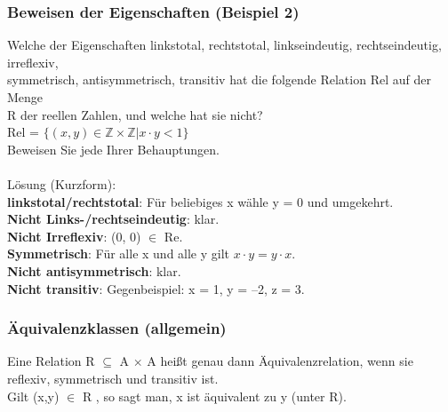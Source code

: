 \documentclass[6pt,a4paper]{scrartcl}
\begin{document}
\begin{multicols*}{2}
\subsubsection{Beweisen der Eigenschaften (Beispiel 2)}
Welche der Eigenschaften linkstotal, rechtstotal, linkseindeutig, rechtseindeutig, irreflexiv,\\
symmetrisch, antisymmetrisch, transitiv hat die folgende Relation Rel auf der Menge\\
R der reellen Zahlen, und welche hat sie nicht?\\
Rel = $\{ (x, y) \in \mathbb{Z} \times \mathbb{Z} | x \cdot y < 1 \}$\\
Beweisen Sie jede Ihrer Behauptungen.\\
\\
Lösung (Kurzform):\\
\textbf{linkstotal/rechtstotal}: Für beliebiges x wähle y = 0 und umgekehrt.\\
\textbf{Nicht Links-/rechtseindeutig}: klar.\\
\textbf{Nicht Irreflexiv}: (0, 0) $\in$ Re.\\
\textbf{Symmetrisch}: Für alle x und alle y gilt $x \cdot y = y \cdot x$.\\
\textbf{Nicht antisymmetrisch}: klar.\\
\textbf{Nicht transitiv}: Gegenbeispiel: x = 1, y = –2, z = 3.\\

\subsubsection{Äquivalenzklassen (allgemein)}
Eine Relation R $\subseteq$ A $\times$ A heißt genau dann Äquivalenzrelation, wenn sie reflexiv, symmetrisch und transitiv ist.\\
Gilt (x,y) $\in$ R , so sagt man, x ist äquivalent zu y (unter R).\\



\end{multicols*}
\end{document}
